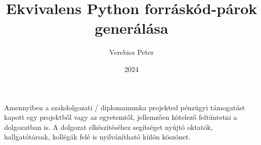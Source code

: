 \documentclass[
]{elteikthesis}[2023/04/10]
\title{Ekvivalens Python forráskód-párok generálása} %
\date{2024} %
\author{Verebics Peter}
\affiliation{doktorandusz} %
\begin{document}


\maketitle
%

\tableofcontents
\cleardoublepage


\cleardoublepage


\cleardoublepage


\cleardoublepage


\cleardoublepage

\chapter*{\acklabel}
Amennyiben a szakdolgozati / diplomamunka projekted pénzügyi támogatást kapott egy projektből
 vagy az egyetemtől, jellemzően kötelező feltüntetni a dolgozatban is.
A dolgozat elkészítéséhez segítséget nyújtó oktatók, hallgatótársak, kollégák felé
 is nyilvánítható külön köszönet.

\appendix

\cleardoublepage

{}
\printbibliography[title=\biblabel]
\cleardoublepage

{}
\listoffigures
\cleardoublepage

{}
\listoftables
\cleardoublepage

{}
\listofalgorithms
\cleardoublepage

{}
\lstlistoflistings
\cleardoublepage

\end{document}
